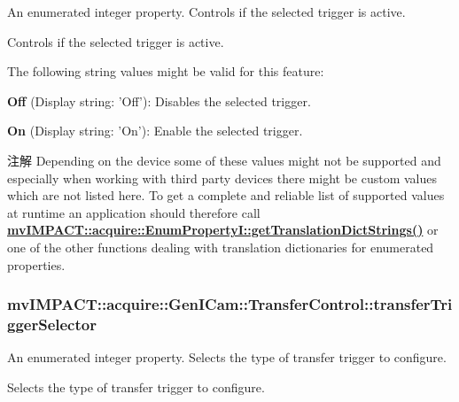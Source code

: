 An enumerated integer property. Controls if the selected trigger is active. 

Controls if the selected trigger is active.

The following string values might be valid for this feature\+:
\begin{DoxyItemize}
\item {\bfseries Off} (Display string\+: 'Off')\+: Disables the selected trigger.
\item {\bfseries On} (Display string\+: 'On')\+: Enable the selected trigger.
\end{DoxyItemize}

\begin{DoxyNote}{注解}
Depending on the device some of these values might not be supported and especially when working with third party devices there might be custom values which are not listed here. To get a complete and reliable list of supported values at runtime an application should therefore call {\bfseries \hyperlink{classmv_i_m_p_a_c_t_1_1acquire_1_1_enum_property_i_a0ba6ccbf5ee69784d5d0b537924d26b6}{mv\+I\+M\+P\+A\+C\+T\+::acquire\+::\+Enum\+Property\+I\+::get\+Translation\+Dict\+Strings()}} or one of the other functions dealing with translation dictionaries for enumerated properties. 
\end{DoxyNote}
\hypertarget{classmv_i_m_p_a_c_t_1_1acquire_1_1_gen_i_cam_1_1_transfer_control_a7e49e86aa9d74e5a9b94b55f67e2d3dc}{
\subsubsection[{transfer\+Trigger\+Selector}]{ mv\+I\+M\+P\+A\+C\+T\+::acquire\+::\+Gen\+I\+Cam\+::\+Transfer\+Control\+::transfer\+Trigger\+Selector}}\label{classmv_i_m_p_a_c_t_1_1acquire_1_1_gen_i_cam_1_1_transfer_control_a7e49e86aa9d74e5a9b94b55f67e2d3dc}


An enumerated integer property. Selects the type of transfer trigger to configure. 

Selects the type of transfer trigger to configure.

